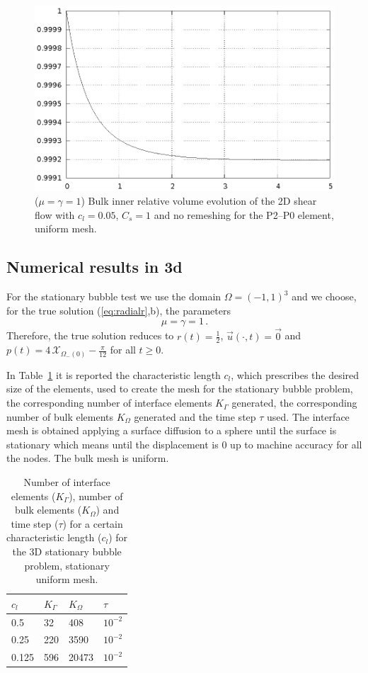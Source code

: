 \documentclass[a4paper,12pt,onecolumn]{article}
\newcommand{\bigchi}{\ensuremath{\mathrm{\mathcal{X}}}}
\newcommand{\charfcn}[1]{\bigchi_{#1}} %
\begin{document}
\begin{figure}[htbp]
  \centering
  \includegraphics[width=.45\textwidth]
  {figures/2d_shear_smooth_bulk_inner_volume.ps}
  \caption{($\mu=\gamma=1$) Bulk inner relative volume evolution of the 2D
shear flow with $c_l=0.05$, $C_s=1$ and no remeshing for the P2--P0 element,
uniform mesh.}
  \label{fig:shear_2d_smooth_bulk_inner_volume}
\end{figure}

\subsection{Numerical results in 3d} \label{subsec:numerical_results_3d}

For the stationary bubble test we use the domain $\Omega = (-1,1)^3$ and we
choose, for the true solution (\ref{eq:radialr},b), the parameters
\begin{equation*}
\mu = \gamma = 1\,.
\end{equation*}
Therefore, the true solution reduces to $r(t) = \frac{1}{2}$, $\vec u(\cdot, t)
= \vec 0$ and $p(t) = 4\,\charfcn{\Omega_-(0)} - \frac{\pi}{12}$ for all
$t\geq0$.

In Table~\ref{tab:bubble3Delements} it is reported the characteristic length
$c_l$, which prescribes the desired size of the elements, used to create the
mesh for the stationary bubble problem, the corresponding number of interface
elements $K_\Gamma$ generated, the corresponding number of bulk elements
$K_\Omega$ generated and the time step $\tau$ used. The interface mesh is
obtained applying a surface diffusion to a sphere until the surface is
stationary which means until the displacement is 0 up to machine accuracy for
all the nodes. The bulk mesh is uniform.
\begin{table}
 \center
\begin{tabular}{llll}
\hline
$c_l$ & $K_\Gamma$ & $K_\Omega$ & $\tau$ \\
\hline
0.5 & 32 & 408 & $10^{-2}$ \\
0.25 & 220 & 3590 & $10^{-2}$\\
0.125 & 596 & 20473 & $10^{-2}$\\
\hline
\end{tabular}
\caption{Number of interface elements ($K_\Gamma$), number of bulk elements
($K_\Omega$) and time step ($\tau$) for a certain characteristic length ($c_l$)
for the 3D stationary bubble problem, stationary uniform mesh.}
\label{tab:bubble3Delements}
\end{table}
\end{document}
